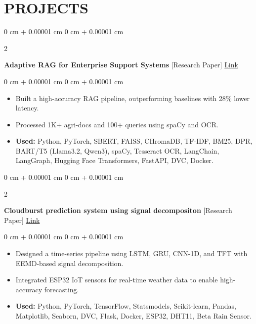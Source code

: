 \documentclass[10pt, letterpaper]{article}
\newenvironment{highlights}{
    \begin{itemize}[
        topsep=0.10 cm,
        parsep=0.10 cm,
        partopsep=0pt,
        itemsep=0pt,
        leftmargin=0 cm + 10pt
    ]
}{
    \end{itemize}
} %
\newenvironment{onecolentry}{
    \begin{adjustwidth}{
        0 cm + 0.00001 cm
    }{
        0 cm + 0.00001 cm
    }
}{
    \end{adjustwidth}
} %
\newenvironment{twocolentry}[2][]{
    \onecolentry
    \def\secondColumn{#2}
    \setcolumnwidth{\fill, 4 cm}
    \begin{paracol}{2}
}{
    \switchcolumn \raggedleft \secondColumn
    \end{paracol}
    \endonecolentry
} %
\begin{document}
    
    \section{PROJECTS}

        \begin{twocolentry}{
            \href{https://github.com/Kshitijk14/rag_for_query_resolution}{Link}
        }
            \textbf{Adaptive RAG for Enterprise Support Systems} [Research Paper]\end{twocolentry}

        \vspace{0.10 cm}
        \begin{onecolentry}
            \begin{highlights}
                \item Built a high-accuracy RAG pipeline, outperforming baselines with 28\% lower latency.
                \item Processed 1K+ agri-docs and 100+ queries using spaCy and OCR.
                \item \textbf{Used:} Python, PyTorch, SBERT, FAISS, CHromaDB, TF-IDF, BM25, DPR, BART/T5 (Llama3.2, Qwen3), spaCy, Tesseract OCR, LangChain, LangGraph, Hugging Face Transformers, FastAPI, DVC, Docker.
            \end{highlights}
        \end{onecolentry}


        \vspace{0.2 cm}

        \begin{twocolentry}{
            \href{https://github.com/Kshitijk14/model-cloud-burst}{Link}
        }
            \textbf{Cloudburst prediction system using signal decompositon} [Research Paper]\end{twocolentry}

        \vspace{0.10 cm}
        \begin{onecolentry}
            \begin{highlights}
                \item Designed a time-series pipeline using LSTM, GRU, CNN-1D, and TFT with EEMD-based signal decomposition.
                \item Integrated ESP32 IoT sensors for real-time weather data to enable high-accuracy forecasting.
                \item \textbf{Used:} Python, PyTorch, TensorFlow, Statsmodels, Scikit-learn, Pandas, Matplotlib, Seaborn, DVC, Flask, Docker, ESP32, DHT11, Beta Rain Sensor.
            \end{highlights}
        \end{onecolentry}
\end{document}
